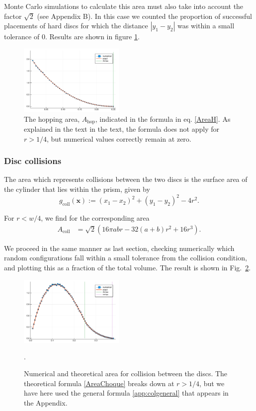 \documentclass[superscriptaddress,pre,reprint,showpacs,twocolumn]{revtex4-1}
\begin{document}
Monte Carlo simulations to calculate this area must also
take into account the factor $\sqrt{2}$ (see Appendix B).
In this case we counted the proportion of successful placements of hard discs 
for which the distance 
$|y_1 - y_2|$ was within a small tolerance of $0$. 
Results are shown in figure \ref{AreaHopp01}.

\begin{figure}[h]
\centering
\includegraphics[width=0.45\textwidth]{./figures/AreaHop01.pdf}
\caption{The hopping area, $A_\text{hop}$, 
  indicated in the formula in eq. \ref{AreaH}. As explained in the text
in the text, the formula does not apply for $r>1/4$, but numerical values correctly
remain at zero.}
\label{AreaHopp01}
\end{figure}


\subsubsection{Disc collisions}

The area which represents collisions between the two discs is the surface area of the cylinder
that lies within the prism, given by
$$g_\text{coll}(\mathbf{x}) := (x_1 - x_2)^2 + (y_1 - y_2)^2 - 4r^2.$$

For $r<w/4$, we find for the corresponding area
\begin{align}\label{AreaChoque}
A_\text{coll} & =  \sqrt{2} (
16\pi a b r -32 (a+b)r^2 +16 r^3).
\end{align}

We proceed in the same manner as last section, checking numerically which
random configurations
fall within a small tolerance from the collision condition, and
plotting this as a fraction of the total volume. The result is shown in Fig.~\ref{AreaChoqueTeoyNum}. 
\begin{figure}
\centering
\includegraphics[width=0.45\textwidth]{./figures/AreaCol01.pdf}
\caption{Numerical and theoretical area 
for collision between the discs.  The theoretical formula 
\ref{AreaChoque} breaks down at
$r>1/4$, but we have here used the general formula \ref{app:colgeneral}
that appears in the Appendix.}
\label{AreaChoqueTeoyNum}.
\end{figure}
\end{document}

